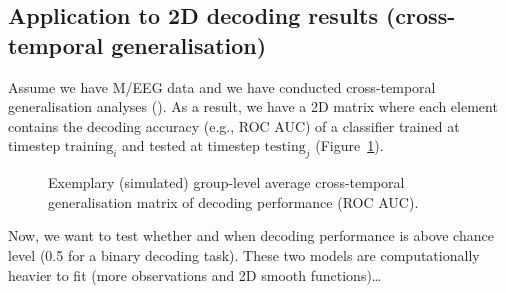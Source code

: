 \documentclass[
  doc,
  floatsintext,
  longtable,
  a4paper,
  nolmodern,
  notxfonts,
  notimes,
  colorlinks=true,linkcolor=blue,citecolor=blue,urlcolor=blue]{apa7}
\begin{document}
\newpage

\subsection{Application to 2D decoding results (cross-temporal
generalisation)}\label{application-to-2d-decoding-results-cross-temporal-generalisation}

Assume we have M/EEG data and we have conducted cross-temporal
generalisation analyses (). As a result, we have a 2D matrix where each element contains the
decoding accuracy (e.g., ROC AUC) of a classifier trained at timestep
\(\text{training}_{i}\) and tested at timestep \(\text{testing}_{j}\)
(Figure~\ref{fig-sim-timegen}).

\begin{figure}[!htb]

\caption{\label{fig-sim-timegen}Exemplary (simulated) group-level
average cross-temporal generalisation matrix of decoding performance
(ROC AUC).}


\end{figure}%

Now, we want to test whether and when decoding performance is above
chance level (0.5 for a binary decoding task). These two models are
computationally heavier to fit (more observations and 2D smooth
functions)\ldots{}
\end{document}
